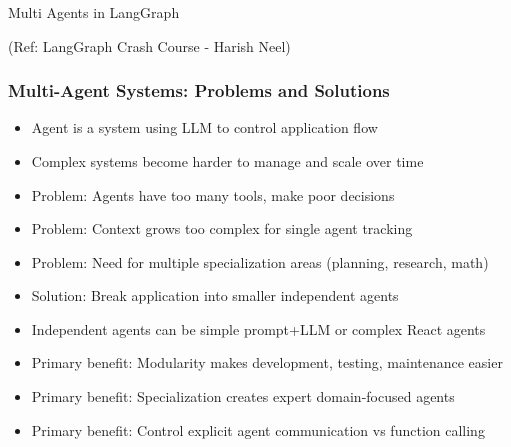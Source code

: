 \begin{frame}[fragile]\frametitle{}
\begin{center}
{\Large Multi Agents in LangGraph}

{\tiny (Ref: LangGraph Crash Course - Harish Neel)}

\end{center}
\end{frame}



\begin{frame}[fragile]\frametitle{Multi-Agent Systems: Problems and Solutions}
      \begin{itemize}
          \item Agent is a system using LLM to control application flow
          \item Complex systems become harder to manage and scale over time
          \item Problem: Agents have too many tools, make poor decisions
          \item Problem: Context grows too complex for single agent tracking
          \item Problem: Need for multiple specialization areas (planning, research, math)
          \item Solution: Break application into smaller independent agents
          \item Independent agents can be simple prompt+LLM or complex React agents
          \item Primary benefit: Modularity makes development, testing, maintenance easier
          \item Primary benefit: Specialization creates expert domain-focused agents
          \item Primary benefit: Control explicit agent communication vs function calling
      \end{itemize}
\end{frame}

